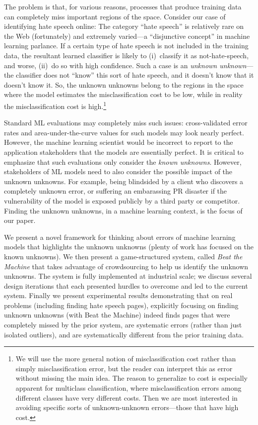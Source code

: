 The problem is that, for various reasons, processes that produce training data can completely miss important regions of the space.  Consider our case of identifying hate speech online: The category ``hate speech'' is relatively rare on the Web (fortunately) and extremely varied---a ``disjunctive concept'' in machine learning parlance.  If a certain type of hate speech is not included in the training data, the resultant learned classifier is likely to (i)~classify it as not-hate-speech, and worse, (ii)~do so with high confidence.  Such a case is an \emph{unknown unknown}---the classifier does not ``know'' this sort of hate speech, and it doesn't know that it doesn't know it. So, the unknown unknowns belong to the regions in the space where the model estimates the misclassification cost to be low, while in reality the misclassification cost is high.\footnote{We will use the more general notion of misclassification cost rather than simply misclassification error, but the reader can interpret this as error without missing the main idea.  The reason to generalize to cost is especially apparent for multiclass classification, where misclassification errors among different classes have very different costs.  Then we are most interested in avoiding specific sorts of unknown-unknown errors---those that have high cost.}

Standard ML evaluations may completely miss such issues: cross-validated error rates and area-under-the-curve values for such models may look nearly perfect.  However, the machine learning scientist would be incorrect to report to the application stakeholders that the models are essentially perfect.  It is critical to emphasize that such evaluations only consider the \emph{known unknowns}. However, stakeholders of ML models need to also consider the possible impact of the unknown unknowns. For example, being blindsided by a client who discovers a completely unknown error, or suffering an embarassing PR disaster if the vulnerability of the model is exposed publicly by a third party or competitor.   Finding the unknown unknowns, in a machine learning context, is the focus of our paper.

We present a novel framework for thinking about errors of machine learning models that highlights the unknown unknowns (plenty of work has focused on the known unknowns).  We then present a game-structured system, called \emph{Beat the Machine} that takes advantage of crowdsourcing to help us identify the unknown unknowns.  The system is fully implemented at industrial scale; we discuss several design iterations that each presented hurdles to overcome and led to the current system.  Finally we present experimental results demonstrating that on real problems (including finding hate speech pages), explicitly focusing on finding unknown unknowns (with Beat the Machine) indeed finds pages that were completely missed by the prior system, are systematic errors (rather than just isolated outliers), and are systematically different from the prior training data. 

